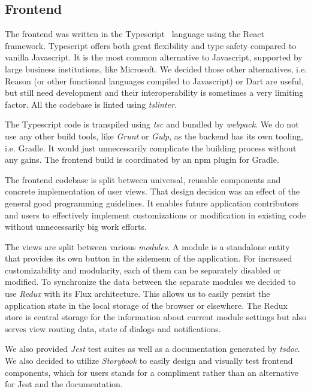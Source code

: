 \documentclass[licencjacka,en]{thesisclass}
\begin{document}
    \subsection{Frontend}

    The frontend was written in the Typescript~\cite{Typescript} language
    using the React~\cite{React} framework.
    Typescript offers both great flexibility and type safety compared to vanilla Javascript.
    It is the most common alternative to Javascript,
    supported by large business institutions, like Microsoft.
    We decided those other alternatives,
    i.e. Reason (or other functional languages compiled to Javascript) or Dart are useful,
    but still need development and their interoperability is sometimes a very limiting factor.
    All the codebase is linted using \textit{tslinter}.

    The Typescript code is transpiled
    using \textit{tsc} and bundled by \textit{webpack}.
    We do not use any other build tools, like
    \textit{Grunt} or \textit{Gulp}, as the backend has its own tooling, i.e. Gradle.
    It would just unnecessarily complicate the building process without any gains.
    The frontend build is coordinated by an npm plugin for Gradle.

    The frontend codebase is split between universal,
    reusable components
    and concrete implementation of user views.
    That design decision was an effect of the general good programming guidelines.
    It enables future application contributors and users
    to effectively implement customizations or modification
    in existing code without unnecessarily big work efforts.

    The views are split between various \textit{modules}.
    A module is a standalone entity that provides its
    own button in the sidemenu of the application.
    For increased customizability and modularity, each of them
    can be separately disabled or modified.
    To synchronize the data between the separate modules we decided
    to use \textit{Redux} with its Flux architecture.
    This allows us to easily persist the application state
    in the local storage of the browser or elsewhere.
    The Redux store is central storage for the information
    about current module settings but also serves view routing data,
    state of dialogs and notifications.

    We also provided \textit{Jest} test suites
    as well as a documentation generated by \textit{tsdoc}.
    We also decided to utilize \textit{Storybook}
    to easily design and visually test frontend components,
    which for users stands for a compliment
    rather than an alternative for Jest and the documentation.
\end{document}

